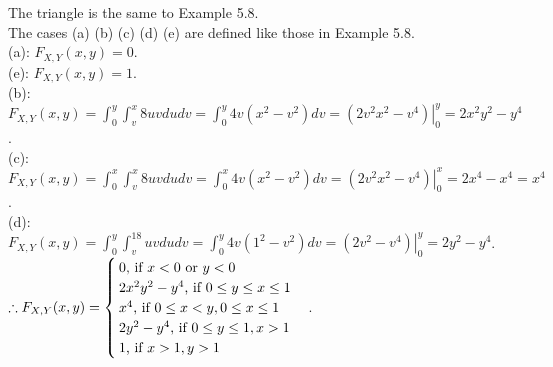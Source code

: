 \begin{pr}
The triangle is the same to Example 5.8.\\
The cases (a) (b) (c) (d) (e) are defined like those in Example 5.8.\\
(a): $F_{X, Y}(x, y)=0$.\\
(e): $F_{X, Y}(x, y)=1$.\\
(b): $F_{X, Y}(x, y)=\int_0^y\int_v^x8uvdudv=\int_0^y4v(x^2-v^2)dv=\left.(2v^2x^2-v^4)\right|_0^y=2x^2y^2-y^4$.\\
(c): $F_{X, Y}(x, y)=\int_0^x\int_v^x8uvdudv=\int_0^x4v(x^2-v^2)dv=\left.(2v^2x^2-v^4)\right|_0^x=2x^4-x^4=x^4$.\\
(d): $F_{X, Y}(x, y)=\int_0^y\int_v^18uvdudv=\int_0^y4v(1^2-v^2)dv=\left.(2v^2-v^4)\right|_0^y=2y^2-y^4$.\\
$\therefore F_{X, Y}(x, y)=\begin{cases}
0\text{, if }x<0\text{ or }y<0\\
2x^2y^2-y^4\text{, if }0\leq y\leq x\leq1\\
x^4\text{, if }0\leq x<y, 0\leq x\leq1\\
2y^2-y^4\text{, if }0\leq y\leq1, x>1\\
1\text{, if }x>1, y>1
\end{cases}$.
\end{pr}
